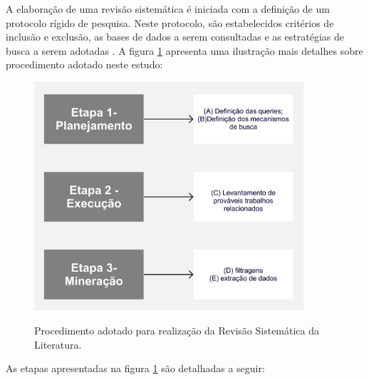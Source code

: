 A elaboração de uma revisão sistemática é iniciada com a definição de um protocolo rígido de pesquisa. Neste protocolo, são estabelecidos critérios de inclusão e exclusão, as bases de dados a serem consultadas e as estratégias de busca a serem adotadas \cite{biolchini2005systematic}. A figura \ref{fig:processo_rev_sistematica} apresenta uma ilustração mais detalhes sobre procedimento adotado neste estudo:

\begin{figure}[H]
    \centering
    \caption{Procedimento adotado para realização da Revisão Sistemática da Literatura.}
    \includegraphics[width=10cm,height=\textwidth,keepaspectratio]{Dissertation//Weslley-Rosalem_Dissertacao-Estudos-Especiais-Quali//2-images/2- Fluxograma mestrado.jpg}
    \newline
    \label{fig:processo_rev_sistematica}
\end{figure}

As etapas apresentadas na figura \ref{fig:processo_rev_sistematica} são detalhadas a seguir:

